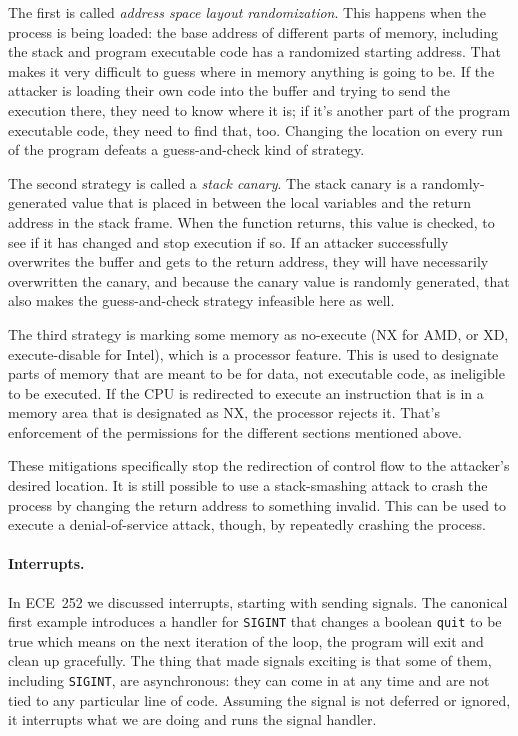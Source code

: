 The first is called \textit{address space layout randomization}. This happens when the process is being loaded: the base address of different parts of memory, including the stack and program executable code has a randomized starting address. That makes it very difficult to guess where in memory anything is going to be. If the attacker is loading their own code into the buffer and trying to send the execution there, they need to know where it is; if it's another part of the program executable code, they need to find that, too. Changing the location on every run of the program defeats a guess-and-check kind of strategy.

The second strategy is called a \textit{stack canary}. The stack canary is a randomly-generated value that is placed in between the local variables and the return address in the stack frame. When the function returns, this value is checked, to see if it has changed and stop execution if so. If an attacker successfully overwrites the buffer and gets to the return address, they will have necessarily overwritten the canary, and because the canary value is randomly generated, that also makes the guess-and-check strategy infeasible here as well.

The third strategy is marking some memory as no-execute (NX for AMD, or XD, execute-disable for Intel), which is a processor feature. This is used to designate parts of memory that are meant to be for data, not executable code, as ineligible to be executed. If the CPU is redirected to execute an instruction that is in a memory area that is designated as NX, the processor rejects it. That's enforcement of the permissions for the different sections mentioned above.

These mitigations specifically stop the redirection of control flow to the attacker's desired location. It is still possible to use a stack-smashing attack to crash the process by changing the return address to something invalid. This can be used to execute a denial-of-service attack, though, by repeatedly crashing the process. 

\paragraph{Interrupts.} In ECE~252 we discussed interrupts, starting with sending signals. The canonical first example introduces a handler for \texttt{SIGINT} that changes a boolean \texttt{quit} to be true which means on the next iteration of the loop, the program will exit and clean up gracefully. The thing that made signals exciting is that some of them, including \texttt{SIGINT}, are asynchronous: they can come in at any time and are not tied to any particular line of code. Assuming the signal is not deferred or ignored, it interrupts what we are doing and runs the signal handler.

